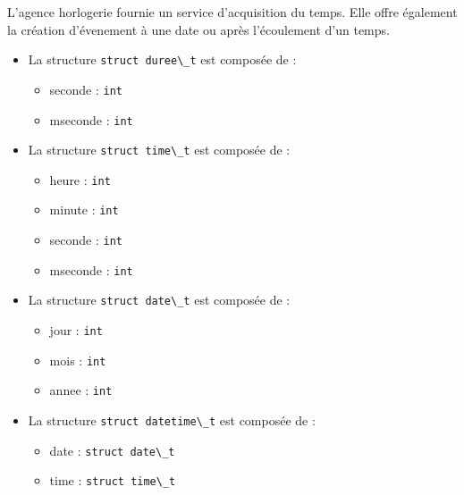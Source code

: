 {
L'agence horlogerie fournie un service d'acquisition du temps.
Elle offre également la création d'évenement à une date ou après l'écoulement d'un temps.
}
{
\begin{itemize}
	\item La structure \lstinline {struct duree\_t} est composée de :
	\begin{itemize}
		\item seconde : \lstinline {int}
		\item mseconde : \lstinline {int} 
	\end{itemize}

	\item La structure \lstinline {struct time\_t} est composée de :
	\begin{itemize}
		\item heure : \lstinline {int}
		\item minute : \lstinline {int} 
		\item seconde : \lstinline {int}
		\item mseconde : \lstinline {int} 
	\end{itemize}

	\item La structure \lstinline {struct date\_t} est composée de :
	\begin{itemize}
		\item jour : \lstinline {int}
		\item mois : \lstinline {int}
		\item annee : \lstinline {int} 
	\end{itemize}

	\item La structure \lstinline {struct datetime\_t} est composée de :
	\begin{itemize}
		\item date : \lstinline {struct date\_t}
		\item time : \lstinline {struct time\_t} 
	\end{itemize}
\end{itemize}
}

